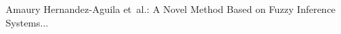 \documentclass[12pt,journal,compsoc]{IEEEtran}
\begin{document}
%
{Amaury Hernandez-Aguila {et~al.}: A Novel Method Based on Fuzzy Inference Systems...}
%









\IEEEcompsoctitleabstractindextext{%



}
\end{document}
